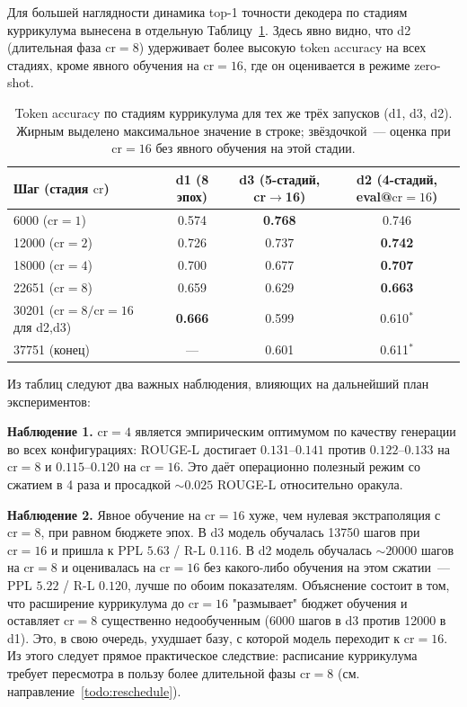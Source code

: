\documentclass[a4paper,12pt]{extarticle}
\begin{document}
Для большей наглядности динамика top-1 точности декодера по стадиям куррикулума вынесена в отдельную Таблицу~\ref{tab:exp-cr16-tokacc}. Здесь явно видно, что d2 (длительная фаза $\text{cr}=8$) удерживает более высокую token accuracy на всех стадиях, кроме явного обучения на $\text{cr}=16$, где он оценивается в режиме zero-shot.

\begin{table}[ht]
\centering
\caption{Token accuracy по стадиям куррикулума для тех же трёх запусков (d1, d3, d2). Жирным выделено максимальное значение в строке; звёздочкой~--- оценка при $\text{cr}=16$ без явного обучения на этой стадии.}
\label{tab:exp-cr16-tokacc}
\footnotesize
\begin{tabular}{lccc}
\toprule
Шаг (стадия $\text{cr}$) & \textbf{d1} (8 эпох) & \textbf{d3} (5-стадий, cr$\to$16) & \textbf{d2} (4-стадий, eval@$\text{cr}=16$) \\
\midrule
6000 ($\text{cr}=1$)    & 0.574          & \textbf{0.768} & 0.746 \\
12000 ($\text{cr}=2$)   & 0.726          & 0.737          & \textbf{0.742} \\
18000 ($\text{cr}=4$)   & 0.700          & 0.677          & \textbf{0.707} \\
22651 ($\text{cr}=8$)   & 0.659          & 0.629          & \textbf{0.663} \\
30201 ($\text{cr}=8 / \text{cr}=16$ для d2,d3) & \textbf{0.666} & 0.599 & 0.610$^{*}$ \\
37751 (конец)           & ---            & 0.601          & 0.611$^{*}$ \\
\bottomrule
\end{tabular}
\end{table}

Из таблиц следуют два важных наблюдения, влияющих на дальнейший план экспериментов:

\textbf{Наблюдение 1.} $\text{cr}=4$ является эмпирическим оптимумом по качеству генерации во всех конфигурациях: ROUGE-L достигает $0.131$--$0.141$ против $0.122$--$0.133$ на $\text{cr}=8$ и $0.115$--$0.120$ на $\text{cr}=16$. Это даёт операционно полезный режим со сжатием в 4 раза и просадкой $\sim 0.025$ ROUGE-L относительно оракула.

\textbf{Наблюдение 2.} Явное обучение на $\text{cr}=16$ хуже, чем нулевая экстраполяция с $\text{cr}=8$, при равном бюджете эпох. В d3 модель обучалась 13750 шагов при $\text{cr}=16$ и пришла к PPL $5.63$ / R-L $0.116$. В d2 модель обучалась $\sim 20000$ шагов на $\text{cr}=8$ и оценивалась на $\text{cr}=16$ без какого-либо обучения на этом сжатии~--- PPL $5.22$ / R-L $0.120$, лучше по обоим показателям. Объяснение состоит в том, что расширение куррикулума до $\text{cr}=16$ "размывает" бюджет обучения и оставляет $\text{cr}=8$ существенно недообученным (6000 шагов в d3 против 12000 в d1). Это, в свою очередь, ухудшает базу, с которой модель переходит к $\text{cr}=16$. Из этого следует прямое практическое следствие: расписание куррикулума требует пересмотра в пользу более длительной фазы $\text{cr}=8$ (см. направление~\ref{todo:reschedule}).
\end{document}
